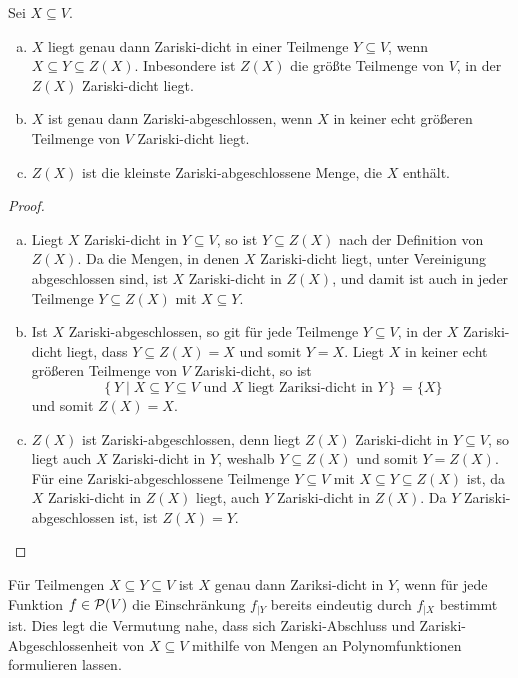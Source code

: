 \documentclass[a4paper,10pt]{article}
\begin{document}
\begin{lem}\label{lem: erste Aussagen über Zariski-Abschluss}
 Sei $X \subseteq V$.
 \begin{enumerate}[a)]
  \item
  $X$ liegt genau dann Zariski-dicht in einer Teilmenge $Y \subseteq V$, wenn $X \subseteq Y \subseteq Z(X)$. Inbesondere ist $Z(X)$ die größte Teilmenge von $V$, in der $Z(X)$ Zariski-dicht liegt.
  \item
  $X$ ist genau dann Zariski-abgeschlossen, wenn $X$ in keiner echt größeren Teilmenge von $V$ Zariski-dicht liegt.
  \item
  $Z(X)$ ist die kleinste Zariski-abgeschlossene Menge, die $X$ enthält. 
 \end{enumerate}
\end{lem}
\begin{proof}
 \begin{enumerate}[a)]
  \item
  Liegt $X$ Zariski-dicht in $Y \subseteq V$, so ist $Y \subseteq Z(X)$ nach der Definition von $Z(X)$. Da die Mengen, in denen $X$ Zariski-dicht liegt, unter Vereinigung abgeschlossen sind, ist $X$ Zariski-dicht in $Z(X)$, und damit ist auch in jeder Teilmenge $Y \subseteq Z(X)$ mit $X \subseteq Y$.
  \item
  Ist $X$ Zariski-abgeschlossen, so git für jede Teilmenge $Y \subseteq V$, in der $X$ Zariski-dicht liegt, dass $Y \subseteq Z(X) = X$ und somit $Y = X$. Liegt $X$ in keiner echt größeren Teilmenge von $V$ Zariski-dicht, so ist
  \[
   \left\{ Y \mid X \subseteq Y \subseteq V \text{ und $X$ liegt Zariksi-dicht in $Y$} \right\} = \{X\} 
  \]
  und somit $Z(X) = X$.
  \item
  $Z(X)$ ist Zariski-abgeschlossen, denn liegt $Z(X)$ Zariski-dicht in $Y \subseteq V$, so liegt auch $X$ Zariski-dicht in $Y$, weshalb $Y \subseteq Z(X)$ und somit $Y = Z(X)$. Für eine Zariski-abgeschlossene Teilmenge $Y \subseteq V$ mit $X \subseteq Y \subseteq Z(X)$ ist, da $X$ Zariski-dicht in $Z(X)$ liegt, auch $Y$ Zariski-dicht in $Z(X)$. Da $Y$  Zariski-abgeschlossen ist, ist $Z(X) = Y$. \qedhere
 \end{enumerate}
\end{proof}


Für Teilmengen $X \subseteq Y \subseteq V$ ist $X$ genau dann Zariksi-dicht in $Y$, wenn für jede Funktion $f \in \mathcal{P}(V)$ die Einschränkung $f_{|Y}$ bereits eindeutig durch $f_{|X}$ bestimmt ist. Dies legt die Vermutung nahe, dass sich Zariski-Abschluss und Zariski-Abgeschlossenheit von $X \subseteq V$ mithilfe von Mengen an Polynomfunktionen formulieren lassen.
\end{document}
